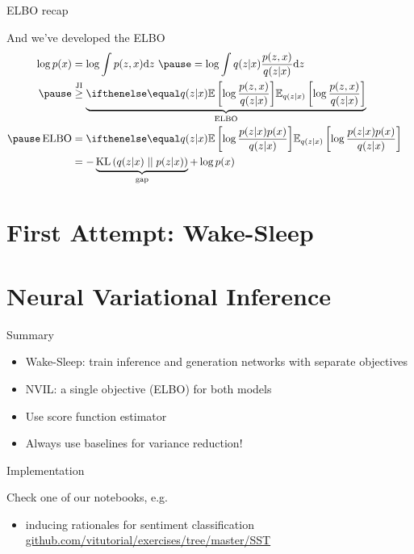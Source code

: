 \begin{frame}{ELBO recap}

And we've developed the ELBO
\begin{equation*}
\begin{aligned}
\log p(x) &= \log \int p(z, x) \dd z ~ \pause = \log \int q(z|x) \frac{p(z, x)}{q(z|x)} \dd z \\ \pause
&\overset{\text{JI}}{\ge} \underbrace{\E[q(z|x)]{\log \frac{p(z, x)}{q(z|x)}} }_{\ELBO} %
& \\ \pause
\ELBO &= \E[q(z|x)]{\log \frac{p(z|x)p(x)}{q(z|x)}} \\
&=-\underbrace{\KL{q(z|x)}{p(z|x)}}_{\text{gap}} + \log p(x)
\end{aligned}
\end{equation*}

\end{frame}


\section{First Attempt: Wake-Sleep}
\frame{\tableofcontents[currentsection]}




\section{Neural Variational Inference}
\frame{\tableofcontents[currentsection]}



\begin{frame}{Summary}
\begin{itemize}
\item Wake-Sleep: train inference and generation networks with separate objectives
\pause
\item NVIL: a single objective (ELBO) for both models\\ \pause
\item Use score function estimator\\ 
\pause
\item Always use baselines for variance reduction!
\end{itemize}
\end{frame}

\begin{frame}{Implementation}

Check one of our notebooks, e.g.
\begin{itemize}
	\item inducing rationales for sentiment classification \\
\url{github.com/vitutorial/exercises/tree/master/SST}
\end{itemize}


\end{frame}

